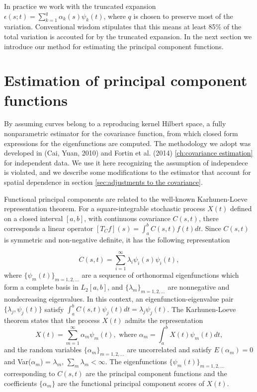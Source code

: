 In practice we work with the truncated expansion $\epsilon(s;t) = \sum_{k=1}^{q} \alpha_k(s)\psi_k(t)$, where $q$ is chosen to preserve most of the variation. Conventional wisdom stipulates that this means at least 85\% of the total variation is accouted for by the truncated expansion. In the next section we introduce our method for estimating the principal component functions.



\section{Estimation of principal component functions} 

\label{sec:eigenfunction_estimation} By assuming curves belong to a reproducing kernel Hilbert space, a fully nonparametric estimator for the covariance function, from which closed form expressions for the eigenfunctions are computed. The methodology we adopt was developed in (Cai, Yuan, 2010) and Fortin et al. (2014) \ref{ch:covariance estimation} for independent data. We use it here recognizing the assumption of independece is violated, and we describe some modifications to the estimator that account for spatial dependence in section \ref{sec:adjustments to the covariance}.

Functional principal components are related to the well-known Karhunen-Loeve representation theorem. For a square-integrable stochastic process $X(t)$ defined on a closed interval $[a,b]$, with continuous covariance $C(s,t)$, there corresponds a linear operator $[T_Cf](s) = \int_a^bC(s,t)f(t)dt$. Since $C(s,t)$ is symmetric and non-negative definite, it has the following representation 

\begin{equation*}
	C(s,t) = \sum_{i=1}^{\infty}\lambda_i\psi_i(s)\psi_i(t), 
\end{equation*}
where $\{\psi_m(t)\}_{m=1,2,\ldots}$ are a sequence of orthonormal eigenfunctions which form a complete basis in $L_2[a,b]$, and $\{\lambda_m \}_{m=1,2,\ldots}$ are nonnegative and nondecreasing eigenvalues. In this context, an eigenfunction-eigenvalue pair $\{\lambda_j, \psi_j(t)\}$ satisfy $\int_a^bC(s,t)\psi_j(t)dt = \lambda_j\psi_j(t)$. The Karhunen-Loeve theorem states that the process $X(t)$ admits the representation 
\begin{equation*}
	X(t) = \sum_{m=1}^{\infty}\alpha_m \psi_m(t), \mbox{ where } \alpha_m = \int_a^b X(t) \psi_m(t)dt, 
\end{equation*}
and the random variables $\{\alpha_m \}_{m=1,2,\ldots}$ are uncorrelated and satisfy $E(\alpha_m)=0$ and Var($\alpha_m$) = $\lambda_m$, $\sum_m \lambda_m < \infty$. The eigenfunctions $\{\psi_m(t)\}_{m=1,2,\ldots}$ corresponding to $C(s,t)$ are the principal component functions and the coefficients $\{\alpha_m \}$ are the functional principal component scores of $X(t)$.


